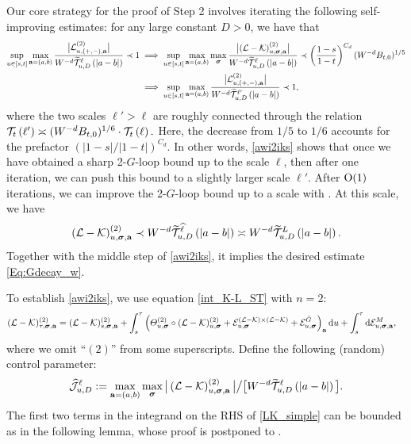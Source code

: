 Our core strategy for the proof of Step 2 involves iterating the following self-improving estimates: for any large constant $D>0$, we have that  %
\begin{align}\label{awi2iks}
\sup_{u\in [s,t]}\max_{{\mathbf{a}}=(a,b)} \frac{\big|{\mathcal L}^{(2)}_{u,(+,-),{\mathbf{a}}}\big|}{W^{-d} \widetilde{{\mathcal T}}^{\ell}_{u,D}\left({ |a-b|}\right)}\prec 1  &\implies \sup_{u\in [s,t]}\max_{{\mathbf{a}}=(a,b)}\max_{{\boldsymbol{\sigma}}} \frac{\big|{(\mathcal L-\mathcal K)}^{(2)}_{u,{\boldsymbol{\sigma}},{\mathbf{a}}}\big|}{W^{-d} \widetilde{{\mathcal T}}^{\ell} _{u,D}\left({|a-b|}\right)}\prec \left({\frac{1-s}{1-t}}\right)^{C_d}(W^{-d}B_{t,0})^{1/5} \nonumber
\\
&\implies \sup_{u\in [s,t]}\max_{{\mathbf{a}}=(a,b)} \frac{\big|{\mathcal L}^{(2)}_{u,(+,-),{\mathbf{a}}}\big|}{W^{-d} \widetilde{{\mathcal T}}^{\ell'}_{u,D}\left({ |a-b|}\right)}\prec 1 ,
\end{align}
where the two scales $\ell'>\ell$ are roughly connected through the relation \({\mathcal T}_{t} \left({\ell'}\right)\asymp  (W^{-d}B_{t,0})^{1/6}\cdot {\mathcal T}_{t}\left({\ell}\right).\)
Here, the decrease from $1/5$ to $1/6$ accounts for the prefactor $(|1-s|/|1-t|)^{C_d}$. In other words, \eqref{awi2iks} shows that once we have obtained a sharp 2-$G$-loop bound up to the scale $\ell$, then after one iteration, we can push this bound to a slightly larger scale $\ell'$. After $\operatorname{O}(1)$ iterations, we can improve the 2-$G$-loop bound up to a scale \smash{$\wh\ell$} with . At this scale, we have 
\[{(\mathcal L-\mathcal K)}^{(2)}_{u,{\boldsymbol{\sigma}},{\mathbf{a}}}\prec W^{-d}\widetilde{{\mathcal T}}^{\widehat\ell}_{u,D}\left({|a-b|}\right)\asymp W^{-d}\widetilde{{\mathcal T}}^{L}_{u,D}\left({|a-b|}\right).\]
Together with the middle step of \eqref{awi2iks}, it implies the desired estimate \eqref{Eq:Gdecay_w}. 

To establish \eqref{awi2iks}, we use equation \eqref{int_K-L_ST} with $n=2$:
\begin{align}\label{LK_simple}
({\mathcal L}-{\mathcal K})^{(2)}_{\tau,{\boldsymbol{\sigma}},{{\mathbf{a}}}}&=({\mathcal L}-{\mathcal K})^{(2)}_{s,{\boldsymbol{\sigma}},{{\mathbf{a}}}}+\int_{s}^{\tau}\left({\varTheta^{(2)}_{u,{\boldsymbol{\sigma}}}\circ({\mathcal L}-{\mathcal K})^{(2)}_{u,{\boldsymbol{\sigma}}} + \mathcal{E}^{(\mathcal{L} - \mathcal{K}) \times (\mathcal{L} - \mathcal{K})}_{u, {\boldsymbol{\sigma}}} + \mathcal{E}^{{\mathring G}}_{u, {\boldsymbol{\sigma}}} }\right)_{{{\mathbf{a}}}}\mathrm{d} u + \int_s^\tau \mathrm{d} \mathcal{E}^{M}_{u, {\boldsymbol{\sigma}}, {{\mathbf{a}}}} ,
\end{align} 
where we omit ``$(2)$'' from some superscripts. %
Define the following (random) control parameter:
\begin{align}\label{defCALJ}
\widehat{\mathcal J}^{\ell}_{u,D}:=\max_{{\mathbf{a}}=(a,b)} \max_{{\boldsymbol{\sigma}}}{\big|\left({\mathcal L-\mathcal K}\right)^{(2)}_{u,{\boldsymbol{\sigma}}, {\mathbf{a}}}\big|}\big/\big[ W^{-d} \widetilde{{\mathcal T}}^{\ell}_{u,D}\left({|a-b|}\right)\big].
\end{align}
The first two terms in the integrand on the RHS of \eqref{LK_simple} can be bounded as in the following lemma, whose proof is postponed to  
.


